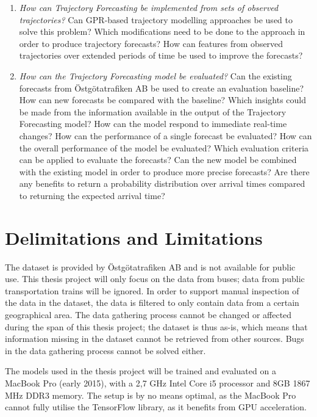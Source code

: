 \begin{description}
\begin{enumerate}
    \item \textit{How can Trajectory Forecasting be implemented from sets of observed trajectories?} \newline
    Can GPR-based trajectory modelling approaches be used to solve this problem?
    Which modifications need to be done to the approach in order to produce trajectory forecasts?
    How can features from observed trajectories over extended periods of time be used to improve the forecasts?

    \item \textit{How can the Trajectory Forecasting model be evaluated?} \newline
    Can the existing forecasts from Östgötatrafiken AB be used to create an evaluation baseline?
    How can new forecasts be compared with the baseline?
    Which insights could be made from the information available in the output of the Trajectory Forecasting model?
    How can the model respond to immediate real-time changes?
    How can the performance of a single forecast be evaluated?
    How can the overall performance of the model be evaluated?
    Which evaluation criteria can be applied to evaluate the forecasts?
    Can the new model be combined with the existing model in order to produce more precise forecasts?
    Are there any benefits to return a probability distribution over arrival times compared to returning the expected arrival time?
  \end{enumerate}
\end{description}

\section{Delimitations and Limitations}
\label{sec:delimitations}
The dataset is provided by Östgötatrafiken AB and is not available for public use.
This thesis project will only focus on the data from buses; data from public transportation trains will be ignored.
In order to support manual inspection of the data in the dataset, the data is filtered to only contain data from a certain geographical area.
The data gathering process cannot be changed or affected during the span of this thesis project; the dataset is thus as-is, which means that information missing in the dataset cannot be retrieved from other sources.
Bugs in the data gathering process cannot be solved either.

The models used in the thesis project will be trained and evaluated on a MacBook Pro (early 2015), with a 2,7 GHz Intel Core i5 processor and 8GB 1867 MHz DDR3 memory.
The setup is by no means optimal, as the MacBook Pro cannot fully utilise the TensorFlow library, as it benefits from GPU acceleration.

